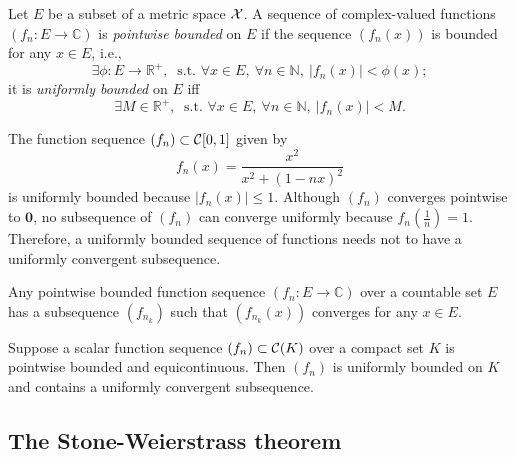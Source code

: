 \begin{defn}
  \label{eq:uniformlyBounded}
  Let $E$ be a subset of a metric space ${\cal X}$.
  A sequence of complex-valued functions $(f_n: E\rightarrow\mathbb{C})$  
  is \emph{pointwise bounded} on $E$
  if the sequence $(f_n(x))$ is bounded for any $x\in E$, i.e.,
  \begin{equation}
    \label{eq:pointwiseBounded}
    \exists \phi:E\rightarrow\mathbb{R}^+,\ \text{ s.t. } \forall x\in E,\
    \forall n\in\mathbb{N},\ |f_n(x)|<\phi(x);
  \end{equation}
  it is \emph{uniformly bounded} on $E$ iff
  \begin{equation}
    \label{eq:uniformlyBounded}
    \exists M\in \mathbb{R}^+,\ \text{ s.t. } \forall x\in E,\
    \forall n\in\mathbb{N},\ |f_n(x)|<M.
  \end{equation}
\end{defn}

\begin{exm}
  The function sequence $(f_n)\subset {\cal C}[0,1]$ given by
  \begin{displaymath}
    f_n(x)=\frac{x^2}{x^2+(1-nx)^2}
  \end{displaymath}
  is uniformly bounded because $|f_n(x)|\le 1$.
  Although $(f_n)$ converges pointwise to $\mathbf{0}$,
   no subsequence of $(f_n)$ can converge uniformly
   because $f_n(\frac{1}{n})=1$.
  Therefore, a uniformly bounded sequence of functions
   needs not to have a uniformly convergent subsequence.
\end{exm}

\begin{lem}
  \label{lem:pointwiseBoundedOnCountableSet}
  Any pointwise bounded function sequence $(f_n: E\rightarrow \mathbb{C})$
  over a countable set $E$ 
  has a subsequence $(f_{n_k})$
  such that $(f_{n_k}(x))$ converges for any $x\in E$. 
\end{lem}

\begin{thm}%
  \label{thm:AscoliSequence}
  Suppose a scalar function sequence $(f_n)\subset {\cal C}(K)$
  over a compact set $K$ is pointwise bounded and equicontinuous.
  Then $(f_n)$ is uniformly bounded on $K$
  and contains a uniformly convergent subsequence.
\end{thm}




\subsection{The Stone-Weierstrass theorem}

